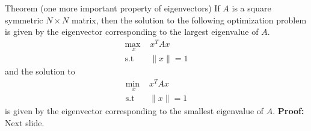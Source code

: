 \begin{frame}
\end{frame}

\begin{frame}
  \begin{block}{Theorem (one more important property of eigenvectors)}
    If $A$ is a square symmetric $N\times N$ matrix, then the solution to the following
    optimization problem is given by the eigenvector corresponding to the largest eigenvalue of $A$.
    \begin{equation*}
      \begin{aligned}
        \underset{x}{\text{max  }} & x^T A x   \\
        \text{s.t }                & \|x\| = 1
      \end{aligned}
    \end{equation*}
    and the solution to
    \begin{equation*}
      \begin{aligned}
        \underset{x}{\text{min  }} & x^T A x   \\
        \text{s.t }                & \|x\| = 1
      \end{aligned}
    \end{equation*}
    is given by the eigenvector corresponding to the smallest eigenvalue of $A$.
    \newline
    \textbf{Proof:} Next slide.
  \end{block}
\end{frame}


